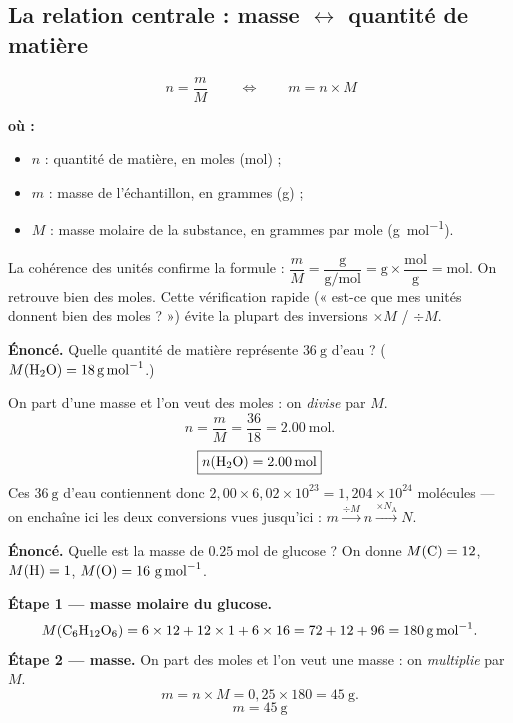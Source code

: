\documentclass[11pt,a4paper]{article}
\newenvironment{ou}{%
  \par\smallskip\noindent\textbf{où :}\nopagebreak
  \begin{itemize}[leftmargin=1.8em,topsep=2pt,itemsep=1.5pt,parsep=0pt]}%
  {\end{itemize}}
\newcommand{\NA}{N_{\!\text{A}}}
\begin{document}
\subsection{La relation centrale : masse $\leftrightarrow$ quantité de matière}

\begin{formule}
\[ \boxed{\,n = \dfrac{m}{M}\,}\qquad\Longleftrightarrow\qquad m = n\times M \]
\begin{ou}
  \item $n$ : quantité de matière, en moles (\si{\mole}) ;
  \item $m$ : masse de l'échantillon, en grammes (\si{\gram}) ;
  \item $M$ : masse molaire de la substance, en grammes par mole (\si{\gram\per\mole}).
\end{ou}
\end{formule}

\begin{remarque}
La cohérence des unités confirme la formule : $\dfrac{m}{M} = \dfrac{\si{\gram}}{\si{\gram\per\mole}}
= \si{\gram}\times\dfrac{\si{\mole}}{\si{\gram}} = \si{\mole}$. On retrouve bien des moles. Cette
vérification rapide (« est-ce que mes unités donnent bien des moles ? ») évite la plupart des
inversions $\times M$ / $\div M$.
\end{remarque}

\begin{exemple}
\textbf{Énoncé.} Quelle quantité de matière représente $\SI{36}{\gram}$ d'eau ?
($M(\ce{H2O}) = \SI{18}{\gram\per\mole}$.)

\smallskip
On part d'une masse et l'on veut des moles : on \emph{divise} par $M$.
\[ n = \frac{m}{M} = \frac{36}{18} = \SI{2.00}{\mole}. \]
\[ \boxed{n(\ce{H2O}) = \SI{2.00}{\mole}} \]
Ces $\SI{36}{\gram}$ d'eau contiennent donc $2{,}00\times 6{,}02\times10^{23} = 1{,}204\times10^{24}$
molécules — on enchaîne ici les deux conversions vues jusqu'ici : $m\xrightarrow{\div M} n
\xrightarrow{\times\NA} N$.
\end{exemple}

\begin{exemple}
\textbf{Énoncé.} Quelle est la masse de $\SI{0.25}{\mole}$ de glucose  ?
On donne $M(\ce{C})=12$, $M(\ce{H})=1$, $M(\ce{O})=16\ \si{\gram\per\mole}$.

\smallskip
\textbf{Étape 1 — masse molaire du glucose.}
\[ M(\ce{C6H12O6}) = 6\times 12 + 12\times 1 + 6\times 16 = 72 + 12 + 96 = \SI{180}{\gram\per\mole}. \]
\textbf{Étape 2 — masse.} On part des moles et l'on veut une masse : on \emph{multiplie} par $M$.
\[ m = n\times M = 0{,}25 \times 180 = \SI{45}{\gram}. \]
\[ \boxed{m = \SI{45}{\gram}} \]
\end{exemple}
\end{document}
